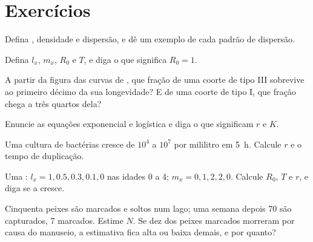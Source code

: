 \section{Exercícios}

\begin{exercise}[$\star$]\label{exo:b1:populations:1}
Defina , densidade e dispersão, e dê um exemplo de cada
padrão de dispersão.
\end{exercise}

\begin{exercise}[$\star$]\label{exo:b1:populations:2}
Defina $l_x$, $m_x$, $R_0$ e $T$, e diga o que significa $R_0 = 1$.
\end{exercise}

\begin{exercise}[$\star$]\label{exo:b1:populations:3}
A partir da figura das curvas de , que fração de uma
coorte de tipo III sobrevive ao primeiro décimo da sua longevidade? E
de uma coorte de tipo I, que fração chega a três quartos dela?
\end{exercise}

\begin{exercise}[$\star$]\label{exo:b1:populations:4}
Enuncie as equações exponencial e logística e diga o que significam
$r$ e $K$.
\end{exercise}

\begin{exercise}[$\star\star$]\label{exo:b1:populations:5}
Uma cultura de bactérias cresce de $10^4$ a $10^7$  por
mililitro em \qty{5}{h}. Calcule $r$ e o tempo de duplicação.
\end{exercise}

\begin{exercise}[$\star\star$]\label{exo:b1:populations:6}
Uma : $l_x = 1, 0.5, 0.3, 0.1, 0$ nas idades 0 a 4; $m_x = 0,
1, 2, 2, 0$. Calcule $R_0$, $T$ e $r$, e diga se a  cresce.
\end{exercise}

\begin{exercise}[$\star\star$]\label{exo:b1:populations:7}
Cinquenta peixes são marcados e soltos num lago; uma semana depois 70
são capturados, 7 marcados. Estime $N$. Se dez dos peixes marcados
morreram por causa do manuseio, a estimativa fica alta ou baixa demais,
e por quanto?
\end{exercise}

